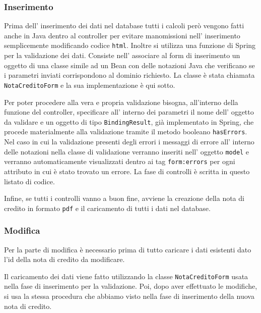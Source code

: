\documentclass[12pt]{book}
\begin{document}
\subsubsection{Inserimento}
Prima dell' inserimento dei dati nel database tutti i calcoli però vengono 
fatti anche in Java dentro al controller per evitare manomissioni 
nell' inserimento semplicemente modificando codice \texttt{html}.
Inoltre si utilizza una funzione di Spring per la validazione dei dati.
Consiste nell' associare al form di inserimento un oggetto di una classe simile
ad un Bean con delle notazioni Java che verificano se i parametri inviati 
corrispondono al dominio richiesto. La classe è stata chiamata 
\texttt{NotaCreditoForm} e la sua implementazione è qui sotto.

Per poter procedere alla vera e propria validazione bisogna, all'interno della
funzione del controller, specificare all' interno dei 
parametri il nome dell' oggetto da validare e un oggetto di tipo 
\texttt{BindingResult}, già implementato in Spring, che procede materialmente 
alla validazione tramite il metodo booleano \texttt{hasErrors}.
Nel caso in cui la validazione presenti degli errori i messaggi di errore 
all' interno delle notazioni nella classe di validazione verranno inseriti 
nell' oggetto \texttt{model} e verranno automaticamente visualizzati dentro 
ai tag \texttt{form:errors} per ogni attributo in cui è stato trovato un errore.
La fase di controlli è scritta in questo listato di codice.

Infine, se tutti i controlli vanno a buon fine, avviene la creazione della nota di 
credito in formato \texttt{pdf} e il caricamento di tutti i dati nel database.

\subsubsection{Modifica}
Per la parte di modifica è necessario prima di tutto caricare i dati esistenti
dato l'id della nota di credito da modificare.

Il caricamento dei dati viene fatto utilizzando la classe 
\texttt{NotaCreditoForm} usata nella fase di inserimento per la validazione.
Poi, dopo aver effettuato le modifiche, si usa la stessa procedura che abbiamo
visto nella fase di inserimento della nuova nota di credito.
\end{document}
